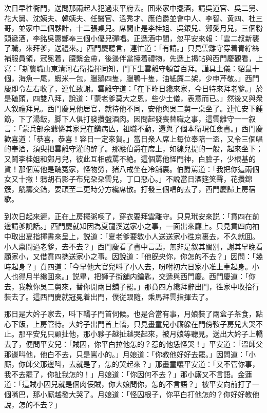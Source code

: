 次日早徃衙門，送問那兩起人犯過東平府去。囬來家中擺酒，請吳道官、吳二舅、花大舅、沈姨夫、韓姨夫、任醫官、溫秀才、應伯爵並會中人、李智、黄四、杜三哥，並家中二個夥計，十二張桌兒。席間止是李桂姐、吳銀兒、鄭愛月兒，三個粉頭遞酒，李銘吳惠鄭奉三個小優兒彈唱。正遞酒中間，忽平安來報：「雲二叔新襲了職，來拜爹，送禮來。」西門慶聽言，連忙道：「有請。」只見雲離守穿着青紵絲補服員領，冠冕着，腰繫金帶，後邊伴當擡着禮物，先遞上揭帖與西門慶觀看，上寫：「新襲職山東清河右衛指揮同知，門下生雲離守頓首百拜。謹具土儀：貂鼠十個，海魚一尾，蝦米一包，臘鵝四隻，臘鴨十隻，油紙簾二架，少申芹敬。」西門慶即令左右收了，連忙致謝。雲離守道：「在下昨日纔來家，今日特來拜老爹。」於是磕頭，四雙八拜，說道：「蒙老爹莫大之恩，些少土儀，表意而已。」然後又與衆人叙禮拜見。西門慶見他居官，就待他不同，安他與吳二舅一桌坐了。連忙安下鍾筯，下了湯飯，脚下人俱打發攢盤酒肉。因問起發喪替職之事，這雲離守一一叙言：「蒙兵部余爺憐其家兄在鎭病亾，祖職不動，還與了個本衛現任僉書。」西門慶歡喜道：「恭喜，恭喜！容日一定來賀。」當日衆人席上每位奉陪一盃，又令三個唱的奉酒，須臾把雲離守灌的醉了。那應伯爵在席上，如線兒提的一般，起來坐下；又鬬李桂姐和鄭月兒，彼此互相戲罵不絶。這個罵他怪門神，白臉子，少根基的貨！那個罵他是醜冤家，怪物勞，猪八戒坐在冷舖裏。伯爵罵道：「我把你這兩個女又十撇！鴉胡石影子布兒朶朶雲兒，丁口惡心。」不說當日酒筵笑聲，花攢錦簇，觥籌交錯，耍頑至二更時分方纔席散。打發三個唱的去了，西門慶歸上房宿歇。

到次日起來遲，正在上房擺粥喫了，穿衣要拜雲離守。只見玳安來説：「賁四在前邊請爹說話。」西門慶就知因為夏龍溪送家小之事，一面出來廳上。只見賁四向袖中取出夏指揮書來呈上，説道：「夏老爹要敎小人送送家小徃京裏去，不久就囬。小人禀問過老爹，去不去？」西門慶看了書中言語，無非是叙其闊別，謝其早晚看顧家小，又借賁四擕送家小之事。因說道：「他旣央你，你怎的不去？」因問：「幾時起身？」賁四道：「今早他大官兒呌了小人去，吩咐初六日家小准上車起身。小人也得月半纔囬來。」説畢，把獅子街舖内鑰匙，交遞與西門慶。西門慶道：「你去，我教你吳二舅來，替你開兩日舖子罷。」那賁四方纔拜辭出門，徃家中收拾行裝去了。這西門慶就冠冕着出門，僕従跟隨，乘馬拜雲指揮去了。

那日是大妗子家去，呌下轎子門首伺候。也是合當有事，月娘裝了兩盒子茶食，點心下飯，上房管待。大妗子出門首上轎，只見畫童兒小廝躱在門傍鞍子房兒大哭不止。那平安兒只顧扯他，那小夥子越扯越哭起來，被月娘等聽見。送出大妗子上轎去了，便問平安兒：「賊囚，你平白拉他怎的？惹的他恁怪哭！」平安道：「溫師父那邊呌他，他白不去，只是罵小的。」月娘道：「你教他好好去罷。」因問道：「小廝，你師父那邊呌，去就是了，怎的哭起來？」那畫童嚷平安道：「又不管你事，我不去罷了，你扯我怎的！」月娘道：「你因何不去？」那小廝又不言語。金蓮道：「這賊小囚兒就是個肉佞賊，你大娘問你，怎的不言語？」被平安向前打了一個嘴巴，那小廝越發大哭了。月娘道：「怪囚根子，你平白打他怎的？你好好教他說，怎的不去？」

